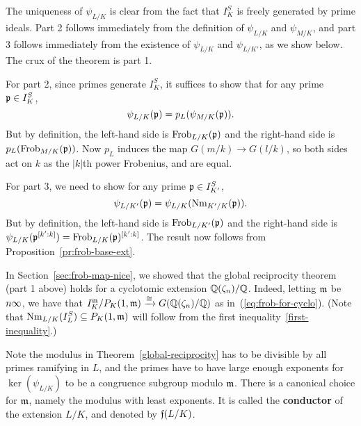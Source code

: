 \begin{rem}
The uniqueness of $\psi_{L/K}$ is clear from the fact that $I_{K}^S$ is freely generated by prime ideals. Part 2 follows immediately from the definition of $\psi_{L/K}$ and $\psi_{M/K}$, and part 3 follows immediately from the existence of $\psi_{L/K}$ and $\psi_{L/K'}$, as we show below. The crux of the theorem is part 1.

For part 2, since primes generate $I_K^S$, it suffices to show that for any prime $\mathfrak{p}\in I_{K}^S$,
\[
\psi_{L/K}(\mathfrak{p})=p_L(\psi_{M/K}(\mathfrak{p})).
\]
But by definition, the left-hand side is $\operatorname{Frob}_{L/K}(\mathfrak{p})$ and the right-hand side is $p_L(\operatorname{Frob}_{M/K}(\mathfrak{p}))$. Now $p_L$ induces the map $G(m/k)\to G(l/k)$, so both sides act on $k$ as the $|k|$th power Frobenius, and are equal.

For part 3, we need to show for any prime $\mathfrak{p}\in I_{K'}^S$,
\[
\psi_{L/K'}(\mathfrak{p})=\psi_{L/K}(\operatorname{Nm}_{K'/K}(\mathfrak{p})).
\]
But by definition, the left-hand side is $\operatorname{Frob}_{L/K'}(\mathfrak{p})$ and the right-hand side is $\psi_{L/K}(\mathfrak{p}^{[k':k]})=\operatorname{Frob}_{L/K}(\mathfrak{p})^{[k':k]}$. The result now follows from Proposition~\ref{pr:frob-base-ext}.
\end{rem}
\begin{ex}
In Section~\ref{sec:frob-map-nice}, we showed that the global reciprocity theorem (part 1 above) holds for a cyclotomic extension $\mathbb{Q}(\zeta_n)/\mathbb{Q}$. Indeed, letting $\mathfrak{m}$ be $n\infty$, we have that $I_K^{\mathfrak{m}}/P_K(1,{\mathfrak{m}})\xrightarrow{\cong}G(\mathbb{Q}(\zeta_n)/\mathbb{Q})$ as in~(\ref{eq:frob-for-cyclo}). (Note that $\operatorname{Nm}_{L/K}(I_L^{S})\subseteq P_K(1,{\mathfrak{m}})$ will follow from the first inequality~\ref{first-inequality}.) 
\end{ex}

Note the modulus in Theorem~\ref{global-reciprocity} has to be divisible by all primes ramifying in $L$, and the primes have to have large enough exponents for $\ker(\psi_{L/K})$ to be a congruence subgroup modulo $\mathfrak{m}$. 
There is a canonical choice for $\mathfrak{m}$, namely the modulus with least exponents. It is called the \textbf{conductor} of the extension $L/K$, and denoted by $\mathfrak{f}(L/K)$.

